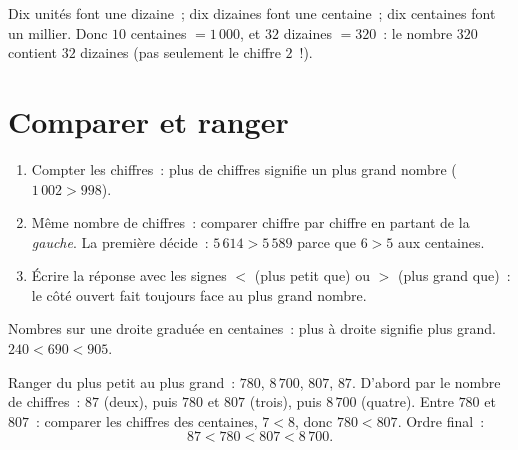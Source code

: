 \begin{example}[Échanges]\label{ex:g3:numbers:exchange}
Dix unités font une dizaine~; dix dizaines font une centaine~; dix
centaines font un millier. Donc $10$ centaines $= 1\,000$, et $32$
dizaines $= 320$~: le nombre $320$ contient $32$ dizaines (pas
seulement le chiffre $2$~!).
\end{example}

\section{Comparer et ranger}

\begin{method}\label{met:g3:numbers:compare}
\begin{enumerate}
  \item Compter les chiffres~: plus de chiffres signifie un plus grand
        nombre ($1\,002 > 998$).
  \item Même nombre de chiffres~: comparer chiffre par chiffre en
        partant de la \emph{gauche}. La première 
        décide~: $5\,614 > 5\,589$ parce que $6 > 5$ aux centaines.
  \item Écrire la réponse avec les signes $<$ (plus petit que) ou
        $>$ (plus grand que)~: le côté ouvert fait toujours face
        au plus grand nombre.
\end{enumerate}
\end{method}

\begin{omfigure}

{\small Nombres sur une droite graduée en centaines~: plus à
droite signifie plus grand. $240 < 690 < 905$.}
\end{omfigure}

\begin{example}\label{ex:g3:numbers:order}
Ranger du plus petit au plus grand~: $780$, $8\,700$, $807$, $87$.
D'abord par le nombre de chiffres~: $87$ (deux), puis $780$ et $807$
(trois), puis $8\,700$ (quatre). Entre $780$ et $807$~: comparer les
chiffres des centaines, $7 < 8$, donc $780 < 807$. Ordre final~:
\[
87 < 780 < 807 < 8\,700 .
\]
\end{example}

